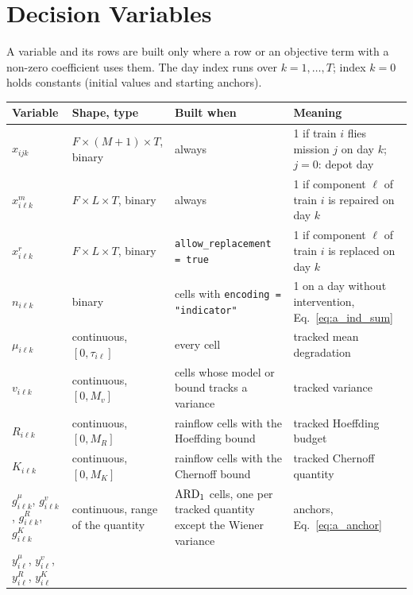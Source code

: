 \endgroup


\section{Decision Variables}
\label{sec:variables}

A variable and its rows are built only where a row or an objective term with a
non-zero coefficient uses them. The day index runs over $k = 1, \ldots, T$; index
$k = 0$ holds constants (initial values and starting anchors).

\begingroup\small
\begin{longtable}{@{}L{2.3cm}L{2.6cm}L{4.2cm}L{5.4cm}@{}}
\toprule
Variable & Shape, type & Built when & Meaning \\
\midrule
\endhead
$x_{ijk}$ & $F \times (M{+}1) \times T$, binary & always &
  1 if train $i$ flies mission $j$ on day $k$; $j = 0$: depot day \\
$x^m_{i\ell k}$ & $F \times L \times T$, binary & always &
  1 if component $\ell$ of train $i$ is repaired on day $k$ \\
$x^r_{i\ell k}$ & $F \times L \times T$, binary & \texttt{allow\_replacement = true} &
  1 if component $\ell$ of train $i$ is replaced on day $k$ \\
$n_{i\ell k}$ & binary & cells with \texttt{encoding = "indicator"} &
  1 on a day without intervention, Eq.~\eqref{eq:a_ind_sum} \\
$\mu_{i\ell k}$ & continuous, $[0, \tau_{i\ell}]$ & every cell &
  tracked mean degradation \\
$v_{i\ell k}$ & continuous, $[0, M_v]$ & cells whose model or bound tracks a variance &
  tracked variance \\
$R_{i\ell k}$ & continuous, $[0, M_R]$ & rainflow cells with the Hoeffding bound &
  tracked Hoeffding budget \\
$K_{i\ell k}$ & continuous, $[0, M_K]$ & rainflow cells with the Chernoff bound &
  tracked Chernoff quantity \\
$g^{\mu}_{i\ell k}$, $g^{v}_{i\ell k}$, $g^{R}_{i\ell k}$, $g^{K}_{i\ell k}$ &
  continuous, range of the quantity & $\mathrm{ARD}_{1}$ cells, one per tracked quantity
  except the Wiener variance & anchors, Eq.~\eqref{eq:a_anchor} \\
$y^{\mu}_{i\ell}$, $y^{v}_{i\ell}$, $y^{R}_{i\ell}$, $y^{K}_{i\ell}$ &

\end{longtable}
